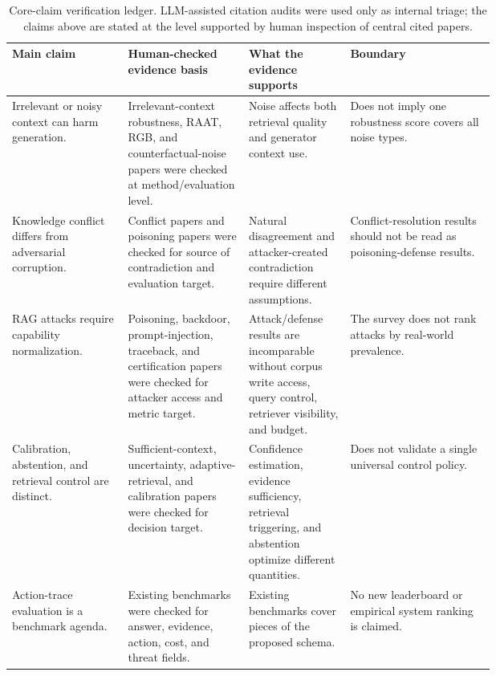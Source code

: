 \begin{table}[t]
\centering
\scriptsize
\renewcommand{\arraystretch}{0.9}
\begin{tabularx}{\linewidth}{>{\raggedright\arraybackslash}p{0.24\linewidth}>{\raggedright\arraybackslash}p{0.25\linewidth}>{\raggedright\arraybackslash}p{0.21\linewidth}X}
\toprule
\textbf{Main claim} & \textbf{Human-checked evidence basis} & \textbf{What the evidence supports} & \textbf{Boundary} \\
\midrule
Irrelevant or noisy context can harm generation. & Irrelevant-context robustness, RAAT, RGB, and counterfactual-noise papers were checked at method/evaluation level. & Noise affects both retrieval quality and generator context use. & Does not imply one robustness score covers all noise types. \\
Knowledge conflict differs from adversarial corruption. & Conflict papers and poisoning papers were checked for source of contradiction and evaluation target. & Natural disagreement and attacker-created contradiction require different assumptions. & Conflict-resolution results should not be read as poisoning-defense results. \\
RAG attacks require capability normalization. & Poisoning, backdoor, prompt-injection, traceback, and certification papers were checked for attacker access and metric target. & Attack/defense results are incomparable without corpus write access, query control, retriever visibility, and budget. & The survey does not rank attacks by real-world prevalence. \\
Calibration, abstention, and retrieval control are distinct. & Sufficient-context, uncertainty, adaptive-retrieval, and calibration papers were checked for decision target. & Confidence estimation, evidence sufficiency, retrieval triggering, and abstention optimize different quantities. & Does not validate a single universal control policy. \\
Action-trace evaluation is a benchmark agenda. & Existing benchmarks were checked for answer, evidence, action, cost, and threat fields. & Existing benchmarks cover pieces of the proposed schema. & No new leaderboard or empirical system ranking is claimed. \\
\bottomrule
\end{tabularx}
\caption{Core-claim verification ledger. LLM-assisted citation audits were used only as internal triage; the claims above are stated at the level supported by human inspection of central cited papers.}
\label{tab:claim-verification-ledger}
\end{table}

